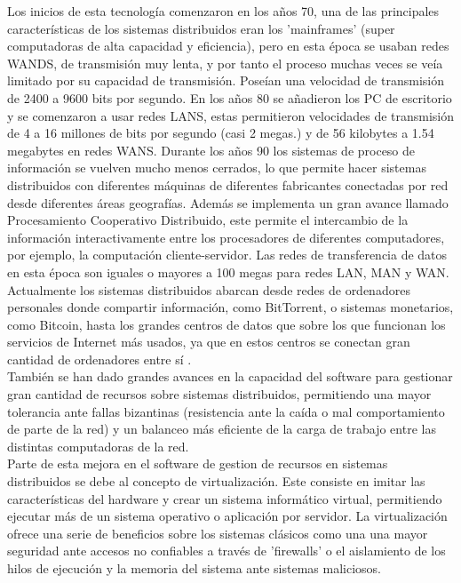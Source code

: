 \documentclass[11pt]{article}
\begin{document}
			Los inicios de esta tecnología comenzaron en los años 70, una de las principales características de los sistemas distribuidos eran los 'mainframes' (super computadoras de alta capacidad y eficiencia), 
			pero en esta época se usaban redes WANDS, de transmisión muy lenta, y por tanto el proceso muchas veces
			se veía limitado por su capacidad de transmisión. Poseían una velocidad de transmisión de 2400 a 9600 bits por segundo.
			En los años 80 se añadieron los PC de escritorio y se comenzaron a usar redes LANS, estas permitieron velocidades de transmisión de 4 a 16 millones de bits por segundo (casi 2 megas.) y
			de 56 kilobytes a 1.54 megabytes en redes WANS.
			Durante los años 90 los sistemas de proceso de información se vuelven mucho menos cerrados, lo que permite hacer sistemas distribuidos con diferentes máquinas de diferentes fabricantes
			conectadas por red desde diferentes áreas geografías. Además se implementa un gran avance llamado Procesamiento Cooperativo Distribuido, este permite el intercambio de la información
			interactivamente entre los procesadores de diferentes computadores, por ejemplo, la computación cliente-servidor. Las redes de transferencia de datos en esta época son iguales o mayores
			a 100 megas para redes LAN, MAN y WAN.
			Actualmente los sistemas distribuidos abarcan desde redes de ordenadores personales donde compartir información, como BitTorrent, o sistemas monetarios, como Bitcoin, hasta los grandes
			centros de datos que sobre los que funcionan los servicios de Internet más usados, ya que en estos centros se conectan gran cantidad de ordenadores entre sí \cite{sistemas-distribuidos}.\\

			También se han dado grandes avances en la capacidad del software para gestionar gran cantidad de recursos sobre sistemas distribuidos, permitiendo una mayor tolerancia ante fallas bizantinas
			(resistencia ante la caída o mal comportamiento de parte de la red) y un balanceo más eficiente de la carga de trabajo entre las distintas computadoras de la red. \\

			Parte de esta mejora en el software de gestion de recursos en sistemas distribuidos se debe al concepto de virtualización. Este consiste en imitar las características del hardware y crear
			un sistema informático virtual, permitiendo ejecutar más de un sistema operativo o aplicación por servidor.
			La virtualización ofrece una serie de beneficios sobre los sistemas clásicos como una una mayor seguridad ante accesos no confiables a través de 'firewalls' o el aislamiento de los hilos de
			ejecución y la memoria del sistema ante sistemas maliciosos.
\end{document}
